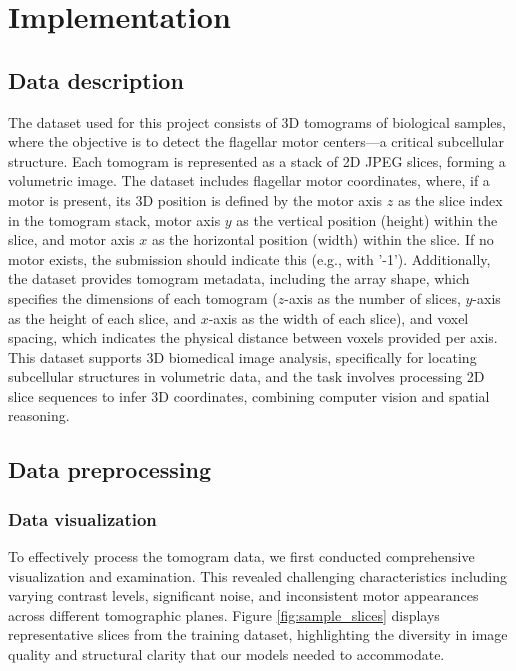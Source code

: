 \documentclass{article}
\begin{document}
\section{Implementation}
\label{sec:impl}

\subsection{Data description}
The dataset\cite{byu-locating-bacterial-flagellar-motors-2025} used for this project consists of 3D tomograms of biological samples, where the objective is to detect the flagellar motor centers—a critical subcellular structure. Each tomogram is represented as a stack of 2D JPEG slices, forming a volumetric image. The dataset includes flagellar motor coordinates, where, if a motor is present, its 3D position is defined by the motor axis $z$ as the slice index in the tomogram stack, motor axis $y$ as the vertical position (height) within the slice, and motor axis $x$ as the horizontal position (width) within the slice. 
If no motor exists, the submission should indicate this (e.g., with '-1'). Additionally, the dataset provides tomogram metadata, including the array shape, which specifies the dimensions of each tomogram ($z$-axis as the number of slices, $y$-axis as the height of each slice, and $x$-axis as the width of each slice), and voxel spacing, which indicates the physical distance between voxels provided per axis. 
This dataset supports 3D biomedical image analysis, specifically for locating subcellular structures in volumetric data, and the task involves processing 2D slice sequences to infer 3D coordinates, combining computer vision and spatial reasoning.

\subsection{Data preprocessing}
\subsubsection{Data visualization}
To effectively process the tomogram data, we first conducted comprehensive visualization and examination. This revealed challenging characteristics including varying contrast levels, significant noise, and inconsistent motor appearances across different tomographic planes. Figure \ref{fig:sample_slices} displays representative slices from the training dataset, highlighting the diversity in image quality and structural clarity that our models needed to accommodate.
\end{document}
